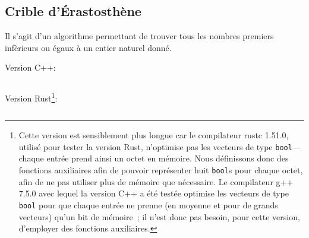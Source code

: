 \subsection{Crible d'Érastosthène}
\label{app:code_erastosthene}


Il s'agit d'un algorithme permettant de trouver tous les nombres premiers infèrieurs ou égaux à un entier naturel donné.

\bigskip

\noindent Version C++: 
\inputminted{C++}{Ensembles_Arithmétique/Code/Érastosthène.cpp}

\bigskip

\noindent Version Rust\footnote{
    Cette version est sensiblement plus longue car le compilateur rustc 1.51.0, utilisé pour tester la version Rust, n'optimise pas les vecteurs de type \texttt{bool}—chaque entrée prend ainsi un octet en mémoire. 
    Nous définissons donc des fonctions auxiliaires afin de pouvoir représenter huit \texttt{bool}s pour chaque octet, afin de ne pas utiliser plus de mémoire que nécessaire.
    Le compilateur g++ 7.5.0 avec lequel la version C++ a été testée optimise les vecteurs de type \texttt{bool} pour que chaque entrée ne prenne (en moyenne et pour de grands vecteurs) qu'un bit de mémoire ; il n'est donc pas besoin, pour cette version, d'employer des fonctions auxiliaires. 
}: 
{\color{white}
\inputminted{Rust}{Ensembles_Arithmétique/Code/Érastosthène.rs}
}
